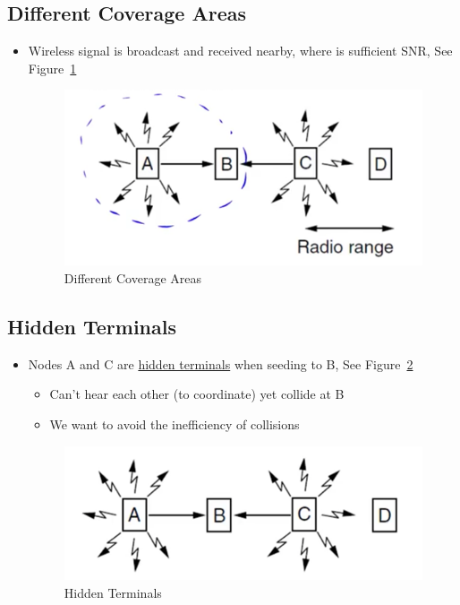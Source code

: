 \documentclass[12pt]{ctexart}   %
\begin{document}
	\subsection{Different Coverage Areas}
	\begin{itemize}
		\item Wireless signal is broadcast and received nearby, where is sufficient SNR, See Figure~\ref{fig:3-6-1}
		
		\begin{figure}[h!] %
		\centering
		 \includegraphics[scale=0.7]{images/3-6-1}
		\caption{ Different Coverage Areas }
		 \label{fig:3-6-1}
		 \end{figure}
	\end{itemize}
	
	\subsection{Hidden Terminals}
	\begin{itemize}
		\item Nodes A and C are \underline{hidden terminals} when seeding to B,  See Figure~\ref{fig:3-6-2}
		\begin{itemize}
			\item Can't hear each other (to coordinate) yet collide at B
			\item We want to avoid the inefficiency of collisions
		\end{itemize}
		
		\begin{figure}[h!] %
		\centering
		 \includegraphics[scale=0.7]{images/3-6-2}
		\caption{ Hidden Terminals }
		 \label{fig:3-6-2}
		 \end{figure}
	\end{itemize}
	
\end{document}
